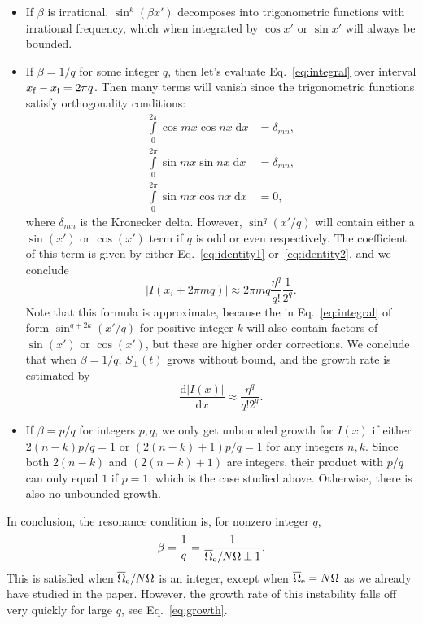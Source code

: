 \documentclass[11pt,
        usenames, %
        dvipsnames %
    ]{article}
\newcommand*{\rd}[2]{\frac{\mathrm{d}#1}{\mathrm{d}#2}}
\newcommand*{\abs}[1]{\left|#1\right|}
\newcommand*{\p}[1]{\left(#1\right)}
\begin{document}
\begin{itemize}
    \item If $\beta$ is irrational, $\sin^k\p{\beta x'}$ decomposes into
        trigonometric functions with irrational frequency, which when
        integrated by $\cos x'$ or $\sin x'$ will always be bounded.

    \item If $\beta = 1/q$ for some integer $q$, then let's evaluate
        Eq.~\eqref{eq:integral} over interval $x_{\rm f} - x_{\rm i} = 2\pi q$.
        Then many terms will vanish since the trigonometric functions satisfy
        orthogonality conditions:
        \begin{align}
            \int\limits_0^{2\pi} \cos mx \cos nx\;\mathrm{d}x &= \delta_{mn},\\
            \int\limits_0^{2\pi} \sin mx \sin nx\;\mathrm{d}x &= \delta_{mn},\\
            \int\limits_0^{2\pi} \sin mx \cos nx\;\mathrm{d}x &= 0,
        \end{align}
        where $\delta_{mn}$ is the Kronecker delta. However, $\sin^{q}\p{x'/q}$
        will contain either a $\sin\p{x'}$ or $\cos\p{x'}$ term if $q$ is odd or
        even respectively. The coefficient of this term is given by
        either Eq.~\eqref{eq:identity1} or~\eqref{eq:identity2}, and we conclude
        \begin{equation}
            \abs{I\p{x_i + 2\pi mq}}
                \approx 2\pi mq\frac{\eta^q}{q!}\frac{1}{2^q}.
        \end{equation}
        Note that this formula is approximate, because the in
        Eq.~\eqref{eq:integral} of form $\sin^{q + 2k}\p{x' / q}$ for positive
        integer $k$ will also contain factors of $\sin\p{x'}$ or $\cos\p{x'}$,
        but these are higher order corrections. We conclude that when $\beta =
        1/q$, $S_{\perp}(t)$ grows without bound, and the growth rate is
        estimated by
        \begin{equation}
            \rd{\abs{I(x)}}{x} \approx \frac{\eta^q}{q!2^q}.
                \label{eq:growth}
        \end{equation}

    \item If $\beta = p/q$ for integers $p, q$, we only get unbounded growth for
        $I(x)$ if either $2\p{n - k}p/q = 1$ or $(2\p{n - k} + 1)p/q = 1$ for
        any integers $n, k$. Since both $2\p{n - k}$ and $(2\p{n - k} + 1)$ are
        integers, their product with $p / q$ can only equal $1$ if $p = 1$,
        which is the case studied above. Otherwise, there is also no unbounded
        growth.
\end{itemize}
In conclusion, the resonance condition is, for nonzero integer $q$,
\begin{equation}
    \beta = \frac{1}{q} = \frac{1}{\overline{\Omega}_{\rm e} / N\Omega \pm 1}.
\end{equation}
This is satisfied when $\overline{\Omega}_{\rm e} / N\Omega$ is an integer,
except when $\overline{\Omega}_{\rm e} = N\Omega$ as we already have studied in
the paper. However, the growth rate of this instability falls off very quickly
for large $q$, see Eq.~\eqref{eq:growth}.
\end{document}
